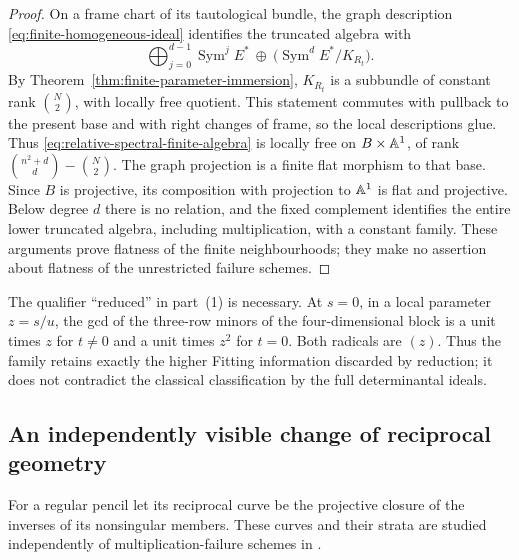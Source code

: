 \documentclass[11pt,reqno]{amsart}
\numberwithin{equation}{section}
\theoremstyle{definition}\newtheorem{definition}[theorem]{Definition}
\theoremstyle{remark}\newtheorem{remark}[theorem]{Remark}
\DeclareMathOperator{\Sym}{Sym}\DeclareMathOperator{\Gr}{Gr}
\begin{document}
\begin{proof}
On a frame chart of its tautological bundle, the graph description
\eqref{eq:finite-homogeneous-ideal} identifies the truncated algebra
with
\begin{equation}\label{eq:relative-spectral-finite-algebra}
 \bigoplus_{j=0}^{d-1}\Sym^j E^*
       \ \oplus\ \bigl(\Sym^d E^*/K_{R_t}\bigr).
\end{equation}
By Theorem~\ref{thm:finite-parameter-immersion}, \(K_{R_t}\)
is a subbundle of constant rank \(\binom N2\), with locally
free quotient.  This statement commutes with pullback to the present
base and with right changes of frame, so the local descriptions glue.
Thus \eqref{eq:relative-spectral-finite-algebra} is locally free
on \(B\times\mathbb A^1\), of rank
\(\binom{n^2+d}{d}-\binom N2\).  The graph projection is a
finite flat morphism to that base.  Since \(B\) is projective,
its composition with projection to \(\mathbb A^1\) is flat and
projective.  Below degree \(d\) there is no relation, and the
fixed complement identifies the entire lower truncated algebra,
including multiplication, with a constant family.  These arguments
prove flatness of the finite neighbourhoods; they make no assertion
about flatness of the unrestricted failure schemes.
\end{proof}

The qualifier ``reduced'' in part~(1) is necessary.  At \(s=0\),
in a local parameter \(z=s/u\), the gcd of the three-row minors of
the four-dimensional block is a unit times \(z\) for \(t\ne0\)
and a unit times \(z^2\) for \(t=0\).  Both radicals are
\((z)\).  Thus the family retains exactly the higher Fitting
information discarded by reduction; it does not contradict the
classical classification by the full determinantal ideals.

\subsection{An independently visible change of reciprocal geometry}

For a regular pencil let its reciprocal curve be the projective closure
of the inverses of its nonsingular members.  These curves and their
strata are studied independently of multiplication-failure schemes in
\cite[\S3]{FevolaMandelshtamSturmfels}.
\end{document}
